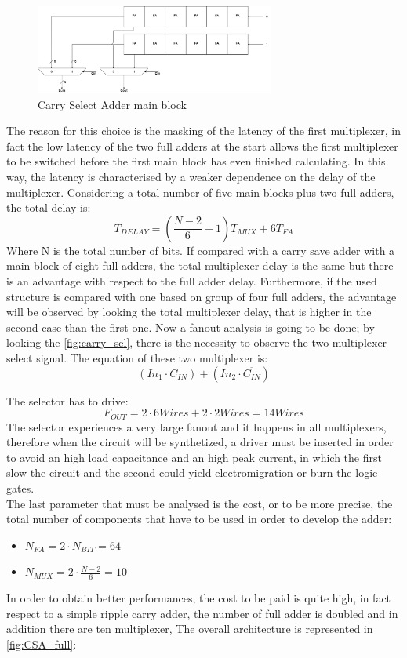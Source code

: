 \begin{figure}[htbp]
	\centering
	\includegraphics[width=0.7\textwidth]{sec2/images/C_sel_A.png}
	\caption{Carry Select Adder main block}
	\label{fig:carry_sel}
\end{figure}
\noindent
The reason for this choice is the masking of the latency of the first multiplexer, in fact the low latency of the two full adders at the start allows the first multiplexer to be switched before the first main block has even finished calculating. In this way, the latency is characterised by a weaker dependence on the delay of the multiplexer. Considering a total number of five main blocks plus two full adders, the total delay is:
\begin{equation}
	T_{DELAY} = (\frac{N-2}{6} - 1)T_{MUX} + 6T_{FA}
\end{equation}
Where N is the total number of bits.
If compared with a carry save adder with a main block of eight full adders, the total multiplexer delay is the same but there is an advantage with respect to the full adder delay. Furthermore, if the used structure is compared with one based on group of four full adders, the advantage will be observed by looking the total multiplexer delay, that is higher in the second case than the first one.
Now a fanout analysis is going to be done; by looking the \autoref{fig:carry_sel}, there is the necessity to observe the two multiplexer select signal. The equation of these two multiplexer is:
\begin{equation}
	(In_1 \cdot C_{IN}) + (In_2 \cdot \overline{C_{IN}})
\end{equation}

The selector has to drive:
\begin{equation}
	F_{OUT} = 2\cdot 6Wires + 2 \cdot 2Wires = 14Wires
\end{equation}
The selector experiences a very large fanout and it happens in all multiplexers, therefore when the circuit will be synthetized, a driver must be inserted in order to avoid an high load capacitance and an high peak current, in which the first slow the circuit and the second could yield electromigration or burn the logic gates.\\
\noindent The last parameter that must be analysed is the cost, or to be more precise, the total number of components that have to be used in order to develop the adder:
\begin{itemize}
	\item $N_{FA} = 2\cdot N_{BIT} = 64$
	\item $N_{MUX} = 2\cdot \frac{N-2}{6}  = 10$
\end{itemize}
In order to obtain better performances, the cost to be paid is quite high, in fact respect to a simple ripple carry adder, the number of full adder is doubled and in addition there are ten multiplexer, The overall architecture is represented in \autoref{fig:CSA_full}:

